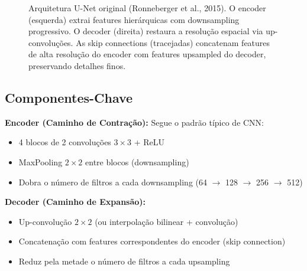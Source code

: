 \begin{figure}[H]
  \caption{Arquitetura U-Net original (Ronneberger et al., 2015). O encoder
  (esquerda) extrai features hierárquicas com downsampling progressivo. O
  decoder (direita) restaura a resolução espacial via up-convoluções. As
  skip connections (tracejadas) concatenam features de alta resolução do
  encoder com features upsampled do decoder, preservando detalhes finos.}
  \label{fig:unet-arch}
\end{figure}

\subsection{Componentes-Chave}

\textbf{Encoder (Caminho de Contração):} Segue o padrão típico de CNN:
\begin{itemize}
  \item 4 blocos de 2 convoluções $3\times3$ + ReLU
  \item MaxPooling $2\times2$ entre blocos (downsampling)
  \item Dobra o número de filtros a cada downsampling (64 $\to$ 128 $\to$ 256 $\to$ 512)
\end{itemize}

\textbf{Decoder (Caminho de Expansão):}
\begin{itemize}
  \item Up-convolução $2\times2$ (ou interpolação bilinear + convolução)
  \item Concatenação com features correspondentes do encoder (skip connection)
  \item Reduz pela metade o número de filtros a cada upsampling
\end{itemize}

